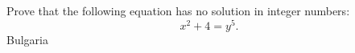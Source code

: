 Prove that the following equation has no solution in integer numbers: \[ x^2 + 4 = y^5.  \] Bulgaria